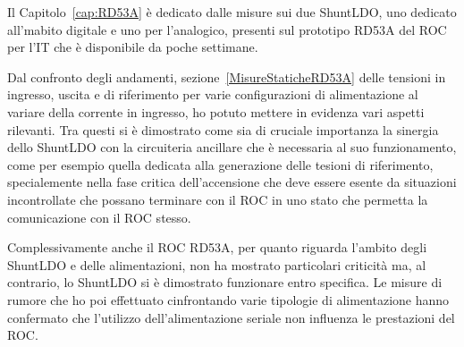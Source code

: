 Il Capitolo~\ref{cap:RD53A} \`e dedicato dalle misure sui due ShuntLDO, uno dedicato all'mabito digitale e uno per l'analogico, presenti sul prototipo RD53A del ROC per l'IT che \`e disponibile da poche settimane.

Dal confronto degli andamenti, sezione~\ref{MisureStaticheRD53A} delle tensioni in ingresso, uscita e di riferimento per varie configurazioni di alimentazione %
al variare della corrente in ingresso, ho potuto mettere in evidenza vari aspetti rilevanti. Tra questi si \`e dimostrato come sia di cruciale importanza la sinergia dello ShuntLDO con la circuiteria ancillare che \`e necessaria al suo funzionamento, come per esempio quella dedicata alla generazione delle tesioni di riferimento, specialemente nella fase critica dell'accensione che deve essere esente da situazioni incontrollate che possano terminare con il ROC in uno stato che permetta la comunicazione con il ROC stesso.

Complessivamente anche il ROC RD53A, per quanto riguarda l'ambito degli ShuntLDO e delle alimentazioni, non ha mostrato particolari criticit\`a ma, al contrario, lo ShuntLDO si \`e dimostrato funzionare entro specifica. Le misure di rumore che ho poi effettuato cinfrontando varie tipologie di alimentazione hanno confermato che l'utilizzo dell'alimentazione seriale non influenza le prestazioni del ROC.


